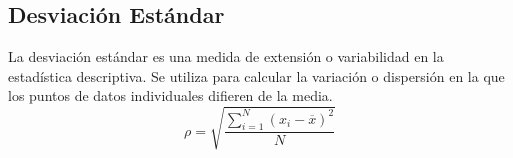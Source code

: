 \documentclass[../main.tex]{subfiles}
\begin{document}
\subsection{Desviación Estándar}
La desviación estándar es una medida de extensión o 
variabilidad en la estadística descriptiva. 
Se utiliza para calcular la variación o dispersión
en la que los puntos de datos individuales difieren 
de la media. 
\begin{equation} \label{desviacion_eq}
    \rho = \sqrt{\frac{\sum^N_{i=1} (x_i - \overline{x})^2}{N}}
\end{equation}
\end{document}
